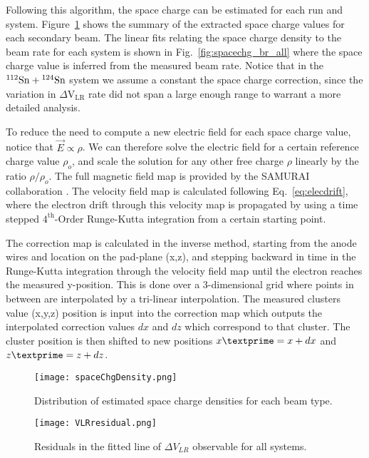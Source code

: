 Following this algorithm, the space charge can be estimated for each run and system. Figure~\ref{fig:scDensity} shows the summary of the extracted space charge values for each secondary beam. The linear fits relating the space charge density to the beam rate for each system is shown in Fig.~\ref{fig:spacechg_br_all} where the space charge value is inferred from the measured beam rate. Notice that in the ${}^{112}\mathrm{Sn} + {}^{124}\mathrm{Sn}$ system we assume a constant the space charge correction, since the variation in $\Delta\mathrm{V}_\mathrm{LR}$ rate did not span a large enough range to warrant a more detailed analysis. 

To reduce the need to compute a new electric field for each space charge value, notice that $\vec{E}\propto \rho$. We can therefore solve the electric field for a certain reference charge value $\rho_o$, and scale the solution for any other free charge $\rho$ linearly by the ratio $\rho/\rho_o$. The full magnetic field map is provided by the SAMURAI collaboration \cite{magnet}. The velocity field map is calculated following Eq.~\ref{eq:elecdrift}, where the electron drift through this velocity map is propagated by using a time stepped $\mathrm{4}^{\mathrm{th}}$-Order Runge-Kutta integration from a certain starting point.
  
 The correction map is calculated in the inverse method, starting from the anode wires and location on the pad-plane (x,z), and stepping backward in time in the Runge-Kutta integration through the velocity field map until the electron reaches the measured y-position. This is done over a 3-dimensional grid where points in between are interpolated by a tri-linear interpolation. The measured clusters value (x,y,z) position is input into the correction map which outputs the interpolated correction values $dx$ and $dz$ which correspond to that cluster. The cluster position is then shifted to new positions $x\textprime = x + dx$ and $z\textprime = z + dz$.
 


\begin{figure}[!htb]
\texttt{[image: spaceChgDensity.png]}
\caption{Distribution of estimated space charge densities for each beam type.}
\label{fig:scDensity}
\end{figure}



\begin{figure}[!htb]
\texttt{[image: VLRresidual.png]}
\caption{Residuals in the fitted line of $\Delta V_{LR}$ observable for all systems.}
\label{fig:vlrResidual}
\end{figure}

